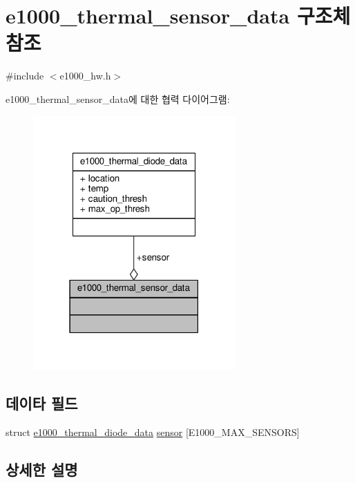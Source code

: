 \hypertarget{structe1000__thermal__sensor__data}{}\section{e1000\+\_\+thermal\+\_\+sensor\+\_\+data 구조체 참조}
\label{structe1000__thermal__sensor__data}


{\ttfamily \#include $<$e1000\+\_\+hw.\+h$>$}



e1000\+\_\+thermal\+\_\+sensor\+\_\+data에 대한 협력 다이어그램\+:
\nopagebreak
\begin{figure}[H]
\begin{center}
\leavevmode
\includegraphics[width=219pt]{structe1000__thermal__sensor__data__coll__graph}
\end{center}
\end{figure}
\subsection*{데이타 필드}
\begin{DoxyCompactItemize}
\item 
struct \hyperlink{structe1000__thermal__diode__data}{e1000\+\_\+thermal\+\_\+diode\+\_\+data} \hyperlink{structe1000__thermal__sensor__data_a40dd5ca367c2a5b1cd406e6288ebee4f}{sensor} \mbox{[}E1000\+\_\+\+M\+A\+X\+\_\+\+S\+E\+N\+S\+O\+RS\mbox{]}
\end{DoxyCompactItemize}


\subsection{상세한 설명}


